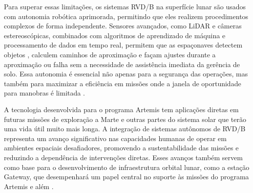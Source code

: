 Para superar essas limitações, os sistemas RVD/B na superfície lunar são usados com autonomia robótica aprimorada, permitindo que eles realizem procedimentos complexos de forma independente. Sensores avançados, como LiDAR \citep{farkasvolgyi2023} e câmeras estereoscópicas, combinados com algoritmos de aprendizado de máquina e processamento de dados em tempo real, permitem que as espaçonaves detectem objetos \citep{ibmComputerVision}, calculem caminhos de aproximação e façam ajustes durante a aproximação ou falha sem a necessidade de assistência imediata da gerência de solo. Essa autonomia é essencial não apenas para a segurança das operações, mas também para maximizar a eficiência em missões onde a janela de oportunidade para manobras é limitada \citep{fehse2003}.

A tecnologia desenvolvida para o programa Artemis tem aplicações diretas em futuras missões de exploração a Marte e outras partes do sistema solar que terão uma vida útil muito mais longa. A integração de sistemas autônomos de RVD/B representa um avanço significativo nas capacidades humanas de operar em ambientes espaciais desafiadores, promovendo a sustentabilidade das missões e reduzindo a dependência de intervenções diretas. Esses avanços também servem como base para o desenvolvimento de infraestrutura orbital lunar, como a estação Gateway, que desempenhará um papel central no suporte às missões do programa Artemis e além \citep{nasaGateway}.
